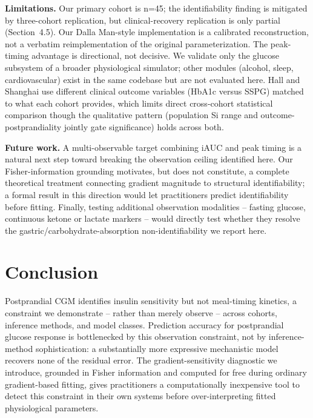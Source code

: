 \documentclass[letterpaper]{article} %
\begin{document}
\textbf{Limitations.} Our primary cohort is n=45; the identifiability finding is mitigated by
three-cohort replication, but clinical-recovery replication is only partial (Section~4.5). Our
Dalla Man-style implementation is a calibrated reconstruction, not a verbatim reimplementation of
the original parameterization. The peak-timing advantage is directional, not decisive. We validate
only the glucose subsystem of a broader physiological simulator; other modules (alcohol, sleep,
cardiovascular) exist in the same codebase but are not evaluated here. Hall and Shanghai use
different clinical outcome variables (HbA1c versus SSPG) matched to what each cohort provides,
which limits direct cross-cohort statistical comparison though the qualitative pattern (population
Si range and outcome-postprandiality jointly gate significance) holds across both.

\textbf{Future work.} A multi-observable target combining iAUC and peak timing is a natural next
step toward breaking the observation ceiling identified here. Our Fisher-information grounding
motivates, but does not constitute, a complete theoretical treatment connecting gradient magnitude
to structural identifiability; a formal result in this direction would let practitioners predict
identifiability before fitting. Finally, testing additional observation modalities -- fasting
glucose, continuous ketone or lactate markers -- would directly test whether they resolve the
gastric/carbohydrate-absorption non-identifiability we report here.

\section{Conclusion}
Postprandial CGM identifies insulin sensitivity but not meal-timing kinetics, a constraint we
demonstrate -- rather than merely observe -- across cohorts, inference methods, and model classes.
Prediction accuracy for postprandial glucose response is bottlenecked by this observation
constraint, not by inference-method sophistication: a substantially more expressive mechanistic
model recovers none of the residual error. The gradient-sensitivity diagnostic we introduce, grounded
in Fisher information and computed for free during ordinary gradient-based fitting, gives
practitioners a computationally inexpensive tool to detect this constraint in their own systems
before over-interpreting fitted physiological parameters.
\end{document}
